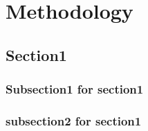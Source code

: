 \documentclass[thesis.tex]{subfiles}
\begin{document}
\chapter{Methodology}

\section{Section1}

\subsection{Subsection1 for section1}

\subsection{subsection2 for section1}
\end{document}
